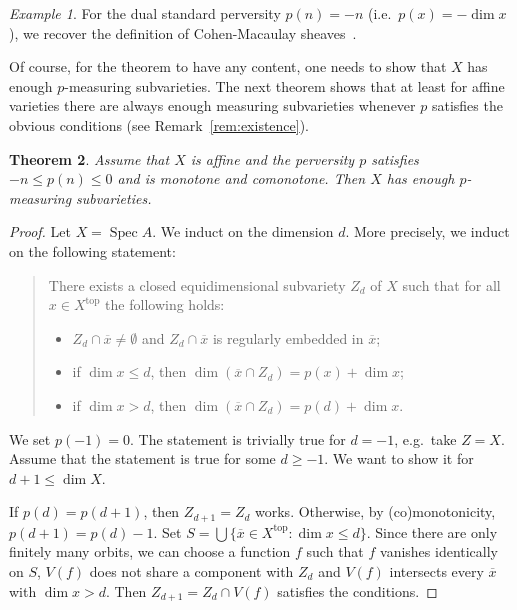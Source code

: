 \documentclass{compositio}
\newcommand\textcgs[1]{}
\theoremstyle{plain}
\newtheorem{Thm}{Theorem}
\theoremstyle{definition}
\theoremstyle{remark}
\newtheorem{Ex}[Thm]{Example}
\DeclareMathOperator\Spec{Spec}
\begin{document}
\begin{Ex}
    For the dual standard perversity $p(n) = -n$ (i.e.\ $p(x) = -\dim x$), we recover the definition of Cohen-Macaulay sheaves~\cite[Section~IV.3]{Hartshorne:1966:ResiduesAndDuality}.
\end{Ex}

Of course, for the theorem to have any content, one needs to show that $X$ has enough $p$-measuring subvarieties.
The next theorem shows that at least for affine varieties there are always enough measuring subvarieties whenever $p$ satisfies the obvious conditions (see Remark~\ref{rem:existence}).

\begin{Thm}\label{thm:existance}%
    Assume that $X$ is affine and the perversity $p$ satisfies $-n \le p(n) \le 0$ and is monotone and comonotone.
    Then $X$ has enough $p$-measuring subvarieties.
\end{Thm}

\begin{proof}
    Let $X = \Spec A$.
    We induct on the dimension $d$.
    More precisely, we induct on the following statement:
    \begin{quote}
        There exists a closed equidimensional subvariety $Z_d$ of $X$ such that for all $x \in  X^{\mathrm{top}}$ the following holds:
        \begin{itemize}
            \item $Z_d \cap \overline x \ne \emptyset$ and $Z_d \cap \overline x$ is regularly embedded in $\overline x$;
            \item if $\dim x \le d$, then $\dim(\overline x \cap  Z_d) = p(x) + \dim x$;
            \item if $\dim x > d$, then $\dim(\overline x \cap  Z_d) = p(d) + \dim x$.
        \end{itemize}
    \end{quote}
    We set $p(-1) = 0$.
    The statement is trivially true for $d = -1$, e.g.~take $Z = X$.
    Assume that the statement is true for some $d \ge -1$.
    We want to show it for $d+1 \le \dim X$.

    If $p(d) = p(d+1)$, then $Z_{d+1} = Z_{d}$ works.
    Otherwise, by (co)monotonicity, $p(d+1) = p(d) - 1$.
    Set $S = \bigcup \{ \overline x \in  X^{\mathrm{top}} : \dim x \le d\}$.
    Since there are only finitely many orbits, we can choose a function $f$ \textcgs{(by choosing individual $f_i$ and multiplying them)}such that $f$ vanishes identically on $S$, $V(f)$ does not share a component with $Z_d$ and $V(f)$ intersects every $\overline x$ with $\dim x > d$.
    Then $Z_{d+1} = Z_d \cap V(f)$ satisfies the conditions.
\end{proof}
\end{document}
